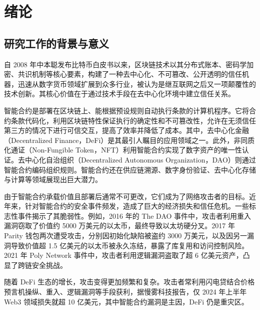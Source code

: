 \documentclass[print, master, vlined, timesmath]{DissertUESTC}
\begin{document}

\tableofcontents  

\chapter{绪论}

\section{研究工作的背景与意义}

自 2008 年中本聪发布比特币白皮书\textsuperscript{\cite{whitebook}}以来，区块链技术以其分布式账本、密码学加密、共识机制等核心要素，构建了一种去中心化、不可篡改、公开透明的信任机器，迅速从数字货币领域扩展到众多行业，被认为是继互联网之后又一项颠覆性的技术创新\textsuperscript{\cite{BlockchainRevolution_2016}}。其核心价值在于通过技术手段在去中心化环境中建立信任关系。

智能合约是部署在区块链上、能根据预设规则自动执行条款的计算机程序。它将合约条款代码化，利用区块链特性保证执行的确定性和不可篡改性，允许在无须信任第三方的情况下进行可信交互，提高了效率并降低了成本。其中，去中心化金融（Decentralized Finance，DeFi）\textsuperscript{\cite{DecentralizedFinance_2020}}是其最引人瞩目的应用领域之一。此外，非同质化通证（Non-Fungible Token，NFT）\textsuperscript{\cite{MappingNFT_2021}}利用智能合约实现了数字资产的唯一性认证。去中心化自治组织（Decentralized Autonomous Organization，DAO）则通过智能合约编码组织规则。智能合约还在供应链溯源、数字身份验证、去中心化存储与计算\textsuperscript{\cite{ComprehensiveSurvey_2023}}等领域展现出巨大潜力。

由于智能合约承载价值且部署后通常不可更改，它们成为了网络攻击者的目标。近年来，针对智能合约的安全事件频发，造成了巨大的经济损失和信任危机。一些标志性事件揭示了其脆弱性。例如，2016 年的 The DAO 事件中，攻击者利用重入漏洞\textsuperscript{\cite{sendner2024large}}窃取了价值约 5000 万美元的以太币，最终导致以太坊硬分叉\textsuperscript{\cite{Stickfork_2017}}。2017 年 Parity 钱包两次遭受攻击，分别因初始化缺陷被盗约 3000 万美元\textsuperscript{\cite{wu2024comprehensive}}，以及因另一漏洞导致价值超 1.5 亿美元的以太币被永久冻结，暴露了库复用和访问控制风险。2021 年 Poly Network 事件中，攻击者利用逻辑漏洞盗取了超 6 亿美元资产\textsuperscript{\cite{PolyNetwork}}，凸显了跨链安全挑战。

随着 DeFi 生态的增长，攻击变得更加频繁和复杂。攻击者常利用闪电贷结合价格预言机操纵、重入、逻辑漏洞等手段获利\textsuperscript{\cite{AttackingDeFi_2021a}}，据慢雾科技报告，仅 2024 年上半年 Web3 领域损失就超 10 亿美元\textsuperscript{\cite{slowmist}}，其中智能合约漏洞是主因，DeFi 仍是重灾区。
\end{document}
